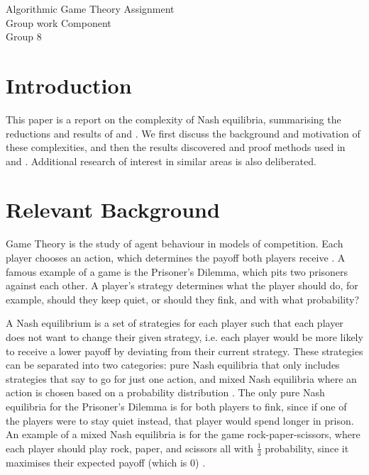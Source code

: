 \documentclass{article}
\begin{document}
\begin{center}
	\LARGE{Algorithmic Game Theory Assignment}\\[0.1cm]
	\Large{Group work Component}\\[0.1cm]
	Group 8\\[0.1cm]
\end{center}
\vspace{0.8cm}

\begin{multicols}{2}
\section{Introduction}
This paper is a report on the complexity of Nash equilibria, summarising the reductions and results of \cite{Daskalakis.2009} and \cite{Fabrikant.2004}. We first discuss the background and motivation of these complexities, and then the results discovered and proof methods used in \cite{Daskalakis.2009} and \cite{Fabrikant.2004}. Additional research of interest in similar areas is also deliberated.
\section{Relevant Background}
Game Theory is the study of agent behaviour in models of competition. Each player chooses an action, which determines the payoff both players receive \cite{OsborneMartinJ..2011}. A famous example of a game is the Prisoner’s Dilemma, which pits two prisoners against each other. A player’s strategy determines what the player should do, for example, should they keep quiet, or should they fink, and with what probability?

A Nash equilibrium is a set of strategies for each player such that each player does not want to change their given strategy, i.e. each player would be more likely to receive a lower payoff by deviating from their current strategy. These strategies can be separated into two categories: pure Nash equilibria that only includes strategies that say to go for just one action, and mixed Nash equilibria where an action is chosen based on a probability distribution \cite{OsborneMartinJ..2011}. The only pure Nash equilibria for the Prisoner’s Dilemma is for both players to fink, since if one of the players were to stay quiet instead, that player would spend longer in prison. An example of a mixed Nash equilibria is for the game rock-paper-scissors, where each player should play rock, paper, and scissors all with $\frac{1}{3}$ probability, since it maximises their expected payoff (which is 0) \cite{Daskalakis.2009}.


\end{multicols}
\end{document}
